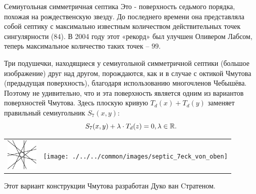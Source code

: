 \begin{surferPage}[7-угольник]{Семиугольная симметричная септика}
Это - поверхность седьмого порядка, похожая на рождественскую звезду. До последнего времени она представляла собой септику с максимально известным количеством действительных точек сингулярности ($84$). В 2004 году этот «рекорд» был улучшен Оливером Лабсом, теперь максимальное количество таких точек – $99$.  
  
Три подушечки, находящиеся у семиугольной симметричной септики (большое изображение) друг над другом, порождаются, как и в случае с октикой Чмутова (предыдущая поверхность), благодаря использованию многочленов Чебышёва. Поэтому не удивительно, что и эта поверхность является одним из вариантов поверхностей Чмутова. Здесь плоскую кривую $T_d(x)+T_d(y)$ заменяет правильный семиугольник
    $S_7(x,y)$: 
   \[S_7(x,y) + \lambda \cdot T_d(z) = 0,\lambda\in{\mathbb R}.\]
    \vspace*{-1.75em}
    \begin{center}
      \begin{tabular}{c@{\qquad}c}
        \includegraphics[height=1.5cm]{./../../common/images/labsseptic1.pdf}
        &
        \texttt{[image: ./../../common/images/septic\_7eck\_von\_oben]}
      \end{tabular}
    \end{center}
    \vspace*{-0.3em}   
	Этот вариант конструкции Чмутова разработан Дуко ван Cтратеном.
\end{surferPage}
